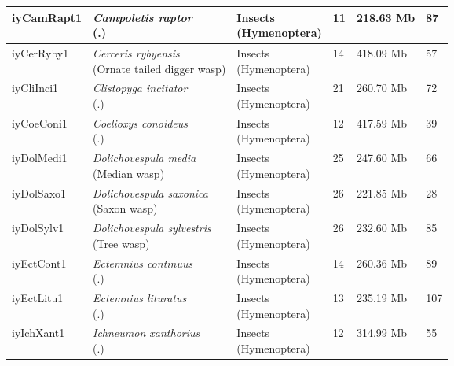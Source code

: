 \begin{centering}
\begin{longtable}{l|l|l|l|l|l}
iyCamRapt1 & \makecell[{l}]{\textit{Campoletis raptor} \\ (.)} & \makecell[{l}]{Insects \\ (Hymenoptera)} & 11 & 218.63 Mb & 87  \\ \hline
iyCerRyby1 & \makecell[{l}]{\textit{Cerceris rybyensis} \\ (Ornate tailed digger wasp)} & \makecell[{l}]{Insects \\ (Hymenoptera)} & 14 & 418.09 Mb & 57  \\ \hline
iyCliInci1 & \makecell[{l}]{\textit{Clistopyga incitator} \\ (.)} & \makecell[{l}]{Insects \\ (Hymenoptera)} & 21 & 260.70 Mb & 72  \\ \hline
iyCoeConi1 & \makecell[{l}]{\textit{Coelioxys conoideus} \\ (.)} & \makecell[{l}]{Insects \\ (Hymenoptera)} & 12 & 417.59 Mb & 39  \\ \hline
iyDolMedi1 & \makecell[{l}]{\textit{Dolichovespula media} \\ (Median wasp)} & \makecell[{l}]{Insects \\ (Hymenoptera)} & 25 & 247.60 Mb & 66  \\ \hline
iyDolSaxo1 & \makecell[{l}]{\textit{Dolichovespula saxonica} \\ (Saxon wasp)} & \makecell[{l}]{Insects \\ (Hymenoptera)} & 26 & 221.85 Mb & 28  \\ \hline
iyDolSylv1 & \makecell[{l}]{\textit{Dolichovespula sylvestris} \\ (Tree wasp)} & \makecell[{l}]{Insects \\ (Hymenoptera)} & 26 & 232.60 Mb & 85  \\ \hline
iyEctCont1 & \makecell[{l}]{\textit{Ectemnius continuus} \\ (.)} & \makecell[{l}]{Insects \\ (Hymenoptera)} & 14 & 260.36 Mb & 89  \\ \hline
iyEctLitu1 & \makecell[{l}]{\textit{Ectemnius lituratus} \\ (.)} & \makecell[{l}]{Insects \\ (Hymenoptera)} & 13 & 235.19 Mb & 107  \\ \hline
iyIchXant1 & \makecell[{l}]{\textit{Ichneumon xanthorius} \\ (.)} & \makecell[{l}]{Insects \\ (Hymenoptera)} & 12 & 314.99 Mb & 55  \\ \hline

\end{longtable}
\end{centering}
